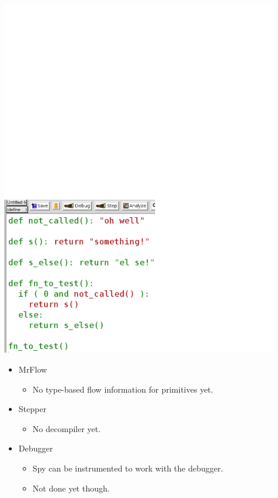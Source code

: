 \documentclass[landscape,20pt,dvips]{foils}
\newcommand{\jhead}[1]{\foilhead{\flushleft \textcolor{vinho}{\large   #1}
\vspace{-0.84cm} \\ {\color{black} --------------------------------------------------------------- }}}
\begin{document}
\begin{center}
\includegraphics[height=15.65cm]{figures/spy-expression-test-coverage-oct-30-2003}
\end{center}
\jhead{Status: DrScheme Tools: Incompatibilities}
  \begin{itemize}
     \item MrFlow
     \begin{itemize}
        \item No type-based flow information for primitives yet.
     \end{itemize}
     \item Stepper
     \begin{itemize}
        \item No decompiler yet.
     \end{itemize}
     \item Debugger
     \begin{itemize}
        \item Spy can be instrumented to work with the debugger.
        \item Not done yet though.
     \end{itemize}
  \end{itemize}
\end{document}
